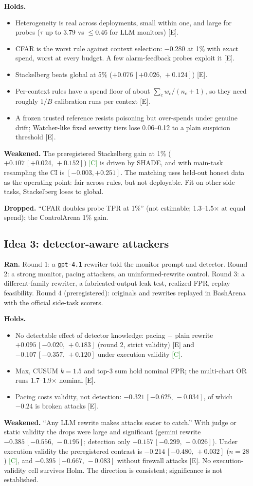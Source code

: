 \documentclass[11pt]{article}
\newcommand{\tC}{\textsf{\scriptsize\textcolor{ForestGreen}{[C]}}\xspace}
\newcommand{\tE}{\textsf{\scriptsize\textcolor{ink2}{[E]}}\xspace}
\newcommand{\ci}[2]{\,[#1,\,#2]}
\begin{document}
\textbf{Holds.}
\begin{itemize}
\item Heterogeneity is real across deployments, small within one, and large for probes ($\tau$ up to 3.79 vs $\le0.46$ for LLM monitors) \tE.
\item CFAR is the worst rule against context selection: $-0.280$ at 1\% with exact spend, worst at every budget. A few alarm-feedback probes exploit it \tE.
\item Stackelberg beats global at 5\% ($+0.076\ci{+0.026}{+0.124}$) \tE.
\item Per-context rules have a spend floor of about $\sum_c w_c/(n_c+1)$, so they need roughly $1/B$ calibration runs per context \tE.
\item A frozen trusted reference resists poisoning but over-spends under genuine drift; Watcher-like fixed severity tiers lose 0.06--0.12 to a plain suspicion threshold \tE.
\end{itemize}
\textbf{Weakened.} The preregistered Stackelberg gain at 1\% ($+0.107\ci{+0.024}{+0.152}$) \tC is driven by SHADE, and with main-task resampling the CI is $[-0.003, +0.251]$. The matching uses held-out honest data as the operating point: fair across rules, but not deployable. Fit on other side tasks, Stackelberg loses to global.

\textbf{Dropped.} ``CFAR doubles probe TPR at 1\%'' (not estimable; 1.3--1.5$\times$ at equal spend); the ControlArena 1\% gain.

\subsection{Idea 3: detector-aware attackers}
\textbf{Ran.} Round 1: a \texttt{gpt-4.1} rewriter told the monitor prompt and detector. Round 2: a strong monitor, pacing attackers, an uninformed-rewrite control. Round 3: a different-family rewriter, a fabricated-output leak test, realized FPR, replay feasibility. Round 4 (preregistered): originals and rewrites replayed in BashArena with the official side-task scorers.

\textbf{Holds.}
\begin{itemize}
\item No detectable effect of detector knowledge: pacing $-$ plain rewrite $+0.095\ci{-0.020}{+0.183}$ (round 2, strict validity) \tE and $-0.107\ci{-0.357}{+0.120}$ under execution validity \tC.
\item Max, CUSUM $k=1.5$ and top-3 sum hold nominal FPR; the multi-chart OR runs 1.7--1.9$\times$ nominal \tE.
\item Pacing costs validity, not detection: $-0.321\ci{-0.625}{-0.034}$, of which $-0.24$ is broken attacks \tE.
\end{itemize}
\textbf{Weakened.} ``Any LLM rewrite makes attacks easier to catch.'' With judge or static validity the drops were large and significant (gemini rewrite $-0.385\ci{-0.556}{-0.195}$; detection only $-0.157\ci{-0.299}{-0.026}$). Under execution validity the preregistered contrast is $-0.214\ci{-0.480}{+0.032}$ ($n=28$) \tC, and $-0.395\ci{-0.667}{-0.083}$ without firewall attacks \tE. No execution-validity cell survives Holm. The direction is consistent; significance is not established.
\end{document}
